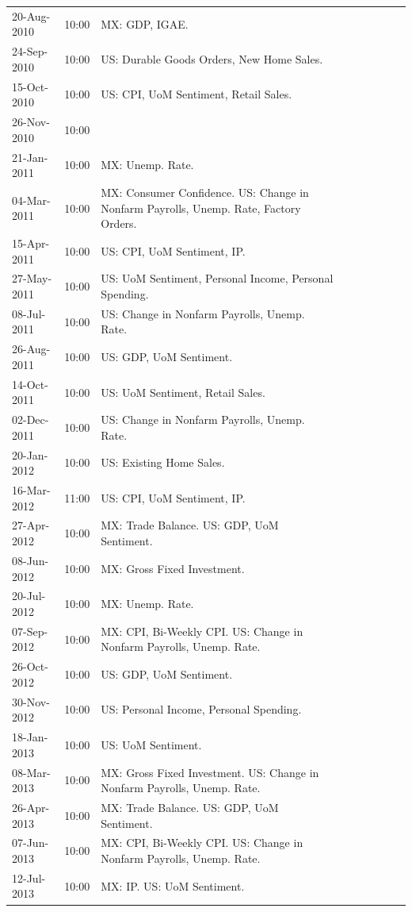\documentclass[a4paper,12pt]{article} 		%
\begin{document}
\begin{tiny}
\begin{center}
\begin{longtable}{p{1.8cm}p{1cm}p{11.7cm}p{1.8cm}p{1cm}p{11.7cm}p{1.8cm}p{1cm}p{11.7cm}}
			20-Aug-2010 & 10:00 & MX: GDP, IGAE. \\
			24-Sep-2010 & 10:00 & US: Durable Goods Orders, New Home Sales. \\
			15-Oct-2010 & 10:00 & US: CPI, UoM Sentiment, Retail Sales. \\
			26-Nov-2010 & 10:00 &  \\
			21-Jan-2011 & 10:00 & MX: Unemp. Rate. \\
			04-Mar-2011 & 10:00 & MX: Consumer Confidence. US: Change in Nonfarm Payrolls, Unemp. Rate, Factory Orders. \\
			15-Apr-2011 & 10:00 & US: CPI, UoM Sentiment, IP. \\
			27-May-2011 & 10:00 & US: UoM Sentiment, Personal Income, Personal Spending. \\
			08-Jul-2011 & 10:00 & US: Change in Nonfarm Payrolls, Unemp. Rate. \\
			26-Aug-2011 & 10:00 & US: GDP, UoM Sentiment. \\
			14-Oct-2011 & 10:00 & US: UoM Sentiment, Retail Sales. \\
			02-Dec-2011 & 10:00 & US: Change in Nonfarm Payrolls, Unemp. Rate. \\
			20-Jan-2012 & 10:00 & US: Existing Home Sales. \\
			16-Mar-2012 & 11:00 & US: CPI, UoM Sentiment, IP. \\
			27-Apr-2012 & 10:00 & MX: Trade Balance. US: GDP, UoM Sentiment. \\
			08-Jun-2012 & 10:00 & MX: Gross Fixed Investment. \\
			20-Jul-2012 & 10:00 & MX: Unemp. Rate. \\
			07-Sep-2012 & 10:00 & MX: CPI, Bi-Weekly CPI. US: Change in Nonfarm Payrolls, Unemp. Rate. \\
			26-Oct-2012 & 10:00 & US: GDP, UoM Sentiment. \\
			30-Nov-2012 & 10:00 & US: Personal Income, Personal Spending. \\
			18-Jan-2013 & 10:00 & US: UoM Sentiment. \\
			08-Mar-2013 & 10:00 & MX: Gross Fixed Investment. US: Change in Nonfarm Payrolls, Unemp. Rate. \\
			26-Apr-2013 & 10:00 & MX: Trade Balance. US: GDP, UoM Sentiment. \\
			07-Jun-2013 & 10:00 & MX: CPI, Bi-Weekly CPI. US: Change in Nonfarm Payrolls, Unemp. Rate. \\
			12-Jul-2013 & 10:00 & MX: IP. US: UoM Sentiment. \\

\end{longtable}
\end{center}
\end{tiny}
\end{document}
